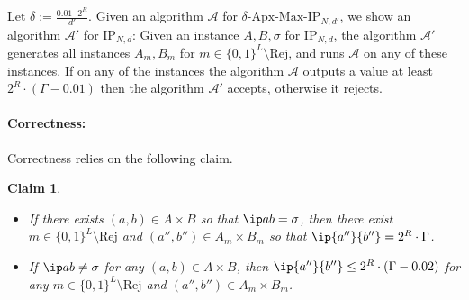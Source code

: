 \documentclass[11pt]{article}
\theoremstyle{plain}
\newtheorem{claim}[thm]{Claim}
\theoremstyle{remark}
\newcommand{\IP}{\mathrm{IP}}
\newcommand{\Max}{\mathrm{Max}}
\newcommand{\Apx}{\mathrm{Apx}}
\newcommand{\rej}{\mathrm{Rej}}
\begin{document}
Let $\delta:= \frac {0.01 \cdot 2^R } {d'}$.
Given an algorithm $\mathcal A$ for $\delta$-$\Apx$-$\Max$-$\IP_{N,d'}$, we show an algorithm $\mathcal {A'}$ for $\IP_{N,d}$:
Given an instance $A,B, \sigma$ for $\IP_{N,d}$, the algorithm $\mathcal {A'}$
generates all instances $A_m,B_m$ for $m \in \{0,1\}^L \setminus \rej$, and
runs $\mathcal A$ on any of these instances. 
If on any of the instances the algorithm $\mathcal A$ outputs a value at least $2^R \cdot (\Gamma - 0.01)$ then the algorithm $\mathcal {A'}$ accepts, otherwise it rejects.

\paragraph{Correctness: }

Correctness relies on the following claim.

\begin{claim}
$\;$
\begin{itemize}
\item If there exists $(a,b) \in A \times B$ so that $\ip a b =\sigma$, then there exist $m \in \{0,1\}^L \setminus \rej$ and  $(a'',b'') \in A_m \times B_m$ so that $\ip {a''} {b''} = 2^R \cdot \Gamma$.
\item If   $\ip a b \neq \sigma$ for any $(a,b) \in A\times B$, then $\ip {a''} {b''} \leq  2^R \cdot (\Gamma -0.02)$ for any $m \in \{0,1\}^L \setminus \rej$ and $(a'',b'') \in A_m \times B_m$.
\end{itemize}
\end{claim}
\end{document}
